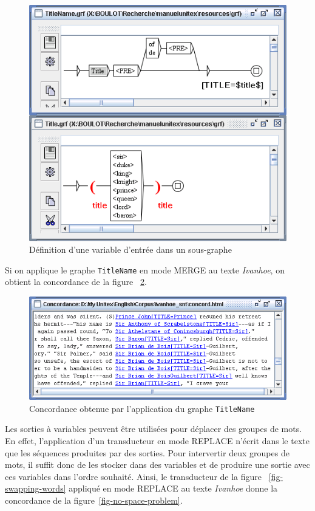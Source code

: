 \begin{figure}[!p]
\begin{center}
\includegraphics[width=12cm]{resources/img/fig6-25.png}
\caption{Définition d’une variable d'entrée dans un sous-graphe\label{fig-variable-definition}}
\end{center}
\end{figure}

\bigskip
\noindent Si on applique le graphe \verb+TitleName+ en mode MERGE au texte
\textit{Ivanhoe}, on obtient la concordance de la figure ~\ref{fig6-14}.

\begin{figure}[!p]
\begin{center}
\includegraphics[width=13.5cm]{resources/img/fig6-26.png}
\caption{Concordance obtenue par l’application du graphe \texttt{TitleName}\label{fig6-14}}
\end{center}
\end{figure}

\bigskip
\noindent Les sorties à variables peuvent être utilisées pour déplacer des groupes de mots. En effet,
l’application d’un transducteur en mode REPLACE n’écrit dans le texte que les séquences
produites par des sorties. Pour intervertir deux groupes de mots, il suffit donc de les stocker
dans des variables et de produire une sortie avec ces variables dans l’ordre souhaité. Ainsi,
le transducteur de la figure
~\ref{fig-swapping-words} appliqué en mode REPLACE au texte \textit{Ivanhoe}
donne la concordance de la figure~\ref{fig-no-space-problem}.

